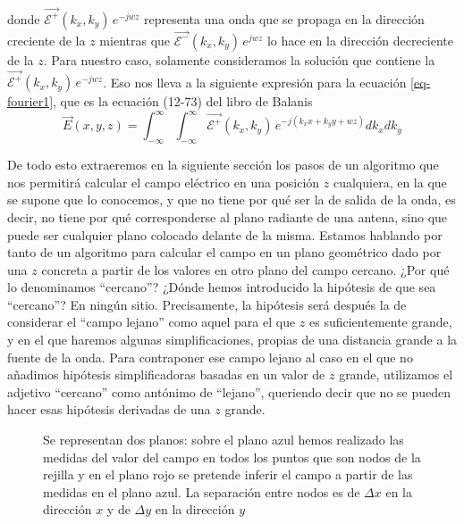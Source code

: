 \documentclass[twocolumn,tikz]{handout}
\begin{document}
donde $\vec{\mathcal{E}^{+}}(k_{x},k_{y})\,e^{-j w z}$ representa
una onda que se propaga en la dirección creciente de la $z$ mientras
que $\vec{\mathcal{E}^{-}}(k_{x},k_{y})\,e^{j w z}$ lo hace en la
dirección decreciente de la $z$. Para nuestro caso, solamente
consideramos la solución que contiene la
$\vec{\mathcal{E}^{+}}(k_{x},k_{y})\,e^{-j w z}$. Eso nos lleva a la
siguiente expresión para la ecuación \eqref{eq-fourier1}, que es la
ecuación (12-73) del libro de Balanis
\begin{equation}
\vec{E}(x,y,z)=\int_{-\infty}^{\infty}\int_{-\infty}^{\infty}\vec{\mathcal{E}^{+}}(k_{x},k_{y})
\,e^{-j (k_{x} x+k_{y} y+w  z)} dk_{x} dk_{y}
\label{eq-fourier2a}
\end{equation}

De todo esto extraeremos en la siguiente sección los pasos de un
algoritmo que nos permitirá calcular el campo eléctrico en una
posición $z$ cualquiera, en la que se supone que lo conocemos, y que
no tiene por qué ser la de salida de la onda, es decir, no tiene por
qué corresponderse al plano radiante de una antena, sino que puede
ser cualquier plano colocado delante de la misma. Estamos hablando
por tanto de un algoritmo para calcular el campo en un plano
geométrico dado por una $z$ concreta a partir de los valores en otro
plano del campo cercano. ¿Por qué lo denominamos ``cercano''? ¿Dónde
hemos introducido la hipótesis de que sea ``cercano''? En ningún
sitio. Precisamente, la hipótesis será después la de considerar el
``campo lejano'' como aquel para el que $z$ es suficientemente
grande, y en el que haremos algunas simplificaciones, propias de una
distancia grande a la fuente de la onda. Para contraponer ese campo
lejano al caso en el que no añadimos hipótesis simplificadoras
basadas en un valor de $z$ grande, utilizamos el adjetivo
``cercano'' como antónimo de ``lejano'', queriendo decir que no se
pueden hacer esas hipótesis derivadas de una $z$ grande.

\begin{figure}
\caption{Se representan dos planos: sobre el plano azul hemos
realizado las medidas del valor del campo en todos los puntos que
son nodos de la rejilla y en el plano rojo se pretende inferir el
campo a partir de las medidas en el plano azul. La separación entre
nodos es de $\Delta x$ en la dirección $x$ y de $\Delta y$ en la
dirección $y$}
\end{figure}
\end{document}
